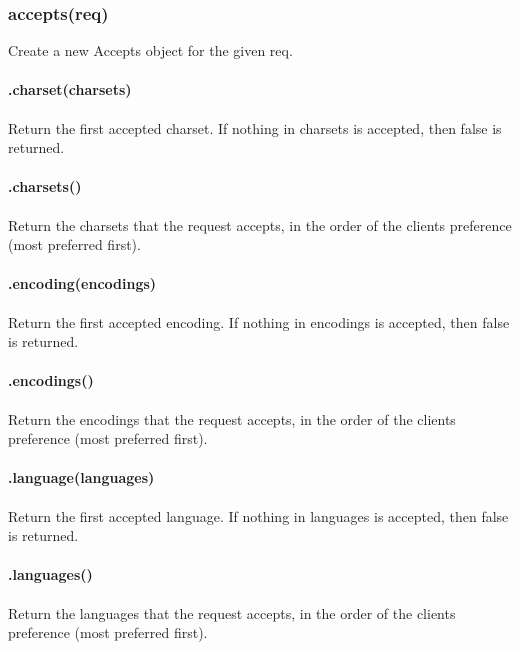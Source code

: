 \subsubsection*{accepts(req)}

Create a new {\ttfamily Accepts} object for the given {\ttfamily req}.

\paragraph*{.charset(charsets)}

Return the first accepted charset. If nothing in {\ttfamily charsets} is accepted, then {\ttfamily false} is returned.

\paragraph*{.charsets()}

Return the charsets that the request accepts, in the order of the client\textquotesingle{}s preference (most preferred first).

\paragraph*{.encoding(encodings)}

Return the first accepted encoding. If nothing in {\ttfamily encodings} is accepted, then {\ttfamily false} is returned.

\paragraph*{.encodings()}

Return the encodings that the request accepts, in the order of the client\textquotesingle{}s preference (most preferred first).

\paragraph*{.language(languages)}

Return the first accepted language. If nothing in {\ttfamily languages} is accepted, then {\ttfamily false} is returned.

\paragraph*{.languages()}

Return the languages that the request accepts, in the order of the client\textquotesingle{}s preference (most preferred first).

